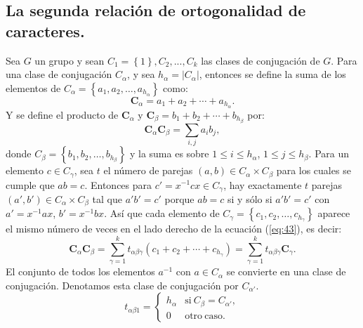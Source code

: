 \documentclass[12pt]{book}
\theoremstyle{definition}
\newcounter{in}
\begin{document}
\subsection{La segunda relación de ortogonalidad de caracteres.}
\label{subsec:sroc}
Sea $G$ un grupo y sean $C_{1}=\left\{1 \right\},C_{2},...,C_{k}$ las
clases de conjugación de $G$. Para una clase de conjugación
$C_{\alpha}$, y sea $h_{\alpha}=|C_{\alpha}|$, entonces se define la
suma de los elementos de $C_{\alpha} = \left \{ a_{1},a_{2}, \ldots, a_{h_{\alpha}} \right \}$ como:
\begin{equation}
  \label{eq:42}
  \boldsymbol{C}_{\alpha}=a_{1}+a_{2}+ \cdots + a_{h_{\alpha}}.
\end{equation}
Y se define el producto de $\boldsymbol{C}_{\alpha}$ y $\boldsymbol{C}_{\beta} = b_1+b_{2}+ \cdots + b_{h_{\beta}}$ por:
\begin{equation}
  \label{eq:43}
  \boldsymbol{C}_{\alpha} \boldsymbol{C}_{\beta} = \sum_{i,j} a_{i} b_{j},
\end{equation}
donde $C_{\beta} = \left \{ b_{1},b_{2}, \ldots, b_{h_{\beta}} \right \}$ y la suma es sobre
$1 \leq i \leq h_{\alpha}$, $1 \leq j \leq h_{\beta}$. Para un
elemento $c \in C_{\gamma}$, sea $t$ el número de parejas
$(a,b) \in C_{\alpha} \times C_{\beta}$ para los cuales se cumple que $ab=c$. Entonces para
$c'=x^{-1}cx \in C_{\gamma}$, hay exactamente $t$
parejas~$(a',b') \in C_{\alpha} \times C_{\beta}$ tal que $a'b'=c'$
porque $ab=c$ si y sólo si $a'b'=c'$ con $a'=x^{-1}ax$,
$b'=x^{-1}bx$. Así que cada elemento de $C_{\gamma} = \left \{ c_{1},c_{2}, \ldots, c_{h_{\gamma}} \right \}$ aparece el mismo
número de veces en el lado derecho de la ecuación (\ref{eq:43}), es decir:
\begin{equation}
  \label{eq:44}
  \boldsymbol{C}_{\alpha} \boldsymbol{C}_{\beta} = \sum_{\gamma=1}^{k} t_{\alpha \beta \gamma} (c_{1} + c_{2} + \cdots + c_{h_{\gamma}}) = \sum_{\gamma=1}^{k} t_{\alpha \beta \gamma} \boldsymbol{C}_{\gamma}.
\end{equation}
El conjunto de todos los elementos $a^{-1}$ con $a \in C_{\alpha}$ se
convierte en una clase de conjugación. Denotamos esta clase de
conjugación por $C_{\alpha '}$.
\begin{equation}
  \label{eq:46}
   t_{\alpha \beta 1} = \left\{
     \begin{array}{ll}
       h_{\alpha}      & \mathrm{si\ } C_{\beta} = C_{\alpha '}, \\
       0      & \mathrm{otro\ caso.\ } 
     \end{array}
   \right.
\end{equation}
\end{document}
